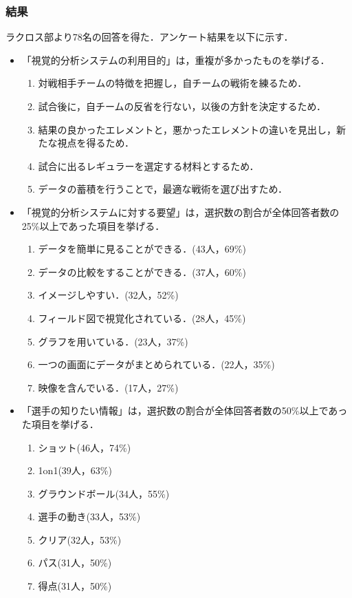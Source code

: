\documentclass[sotsuron]{kuee}
\begin{document}
			\subsubsection{結果}
				ラクロス部より78名の回答を得た．アンケート結果を以下に示す．
				\begin{itemize}
					\item 「視覚的分析システムの利用目的」は，重複が多かったものを挙げる．
						\begin{enumerate}
						\item 対戦相手チームの特徴を把握し，自チームの戦術を練るため．
						\item 試合後に，自チームの反省を行ない，以後の方針を決定するため．
						\item 結果の良かったエレメントと，悪かったエレメントの違いを見出し，新たな視点を得るため．
						\item 試合に出るレギュラーを選定する材料とするため．
						\item データの蓄積を行うことで，最適な戦術を選び出すため．
						\end{enumerate}
					\item 「視覚的分析システムに対する要望」は，選択数の割合が全体回答者数の25\%以上であった項目を挙げる．
						\begin{enumerate}
						\item データを簡単に見ることができる．(43人，69\%)
						\item データの比較をすることができる．(37人，60\%)
						\item イメージしやすい．(32人，52\%)
						\item フィールド図で視覚化されている．(28人，45\%)
						\item グラフを用いている．(23人，37\%)
						\item 一つの画面にデータがまとめられている．(22人，35\%)
						\item 映像を含んでいる．(17人，27\%)
						\end{enumerate}
					\item 「選手の知りたい情報」は，選択数の割合が全体回答者数の50\%以上であった項目を挙げる．
						\begin{enumerate}
						\item ショット(46人，74\%)
						\item 1on1(39人，63\%)
						\item グラウンドボール(34人，55\%)
						\item 選手の動き(33人，53\%)
						\item クリア(32人，53\%)
						\item パス(31人，50\%)
						\item 得点(31人，50\%)
						\end{enumerate}
				\end{itemize}
\end{document}
